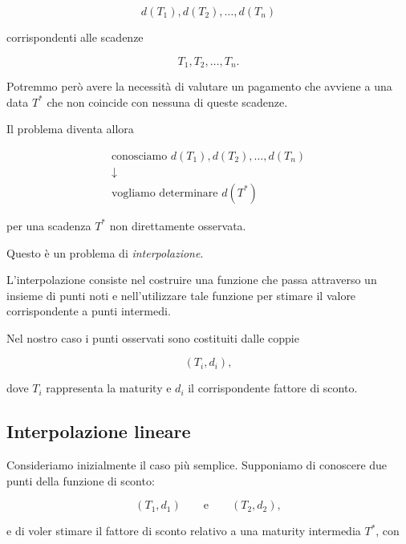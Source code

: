 \begin{equation*}
    d(T_1), d(T_2), \ldots, d(T_n)
\end{equation*}

corrispondenti alle scadenze

\begin{equation*}
    T_1,T_2,\ldots,T_n.
\end{equation*}

Potremmo però avere la necessità di valutare un pagamento che avviene
a una data $T^*$ che non coincide con nessuna di queste scadenze.

Il problema diventa allora

\begin{equation*}
\boxed{
\begin{array}{c}
\text{conosciamo } d(T_1),d(T_2),\ldots,d(T_n)\\[2mm]
\downarrow\\[2mm]
\text{vogliamo determinare } d(T^*)
\end{array}}
\end{equation*}

per una scadenza $T^*$ non direttamente osservata.

Questo è un problema di \emph{interpolazione}.

L'interpolazione consiste nel costruire una funzione che passa
attraverso un insieme di punti noti e nell'utilizzare tale funzione
per stimare il valore corrispondente a punti intermedi.

Nel nostro caso i punti osservati sono costituiti dalle coppie

\begin{equation*}
    (T_i,d_i),
\end{equation*}

dove $T_i$ rappresenta la maturity e $d_i$ il corrispondente fattore
di sconto.


\subsection{Interpolazione lineare}

Consideriamo inizialmente il caso più semplice. Supponiamo di conoscere
due punti della funzione di sconto:

\begin{equation*}
    (T_1,d_1)
    \qquad\text{e}\qquad
    (T_2,d_2),
\end{equation*}

e di voler stimare il fattore di sconto relativo a una maturity
intermedia $T^*$, con

